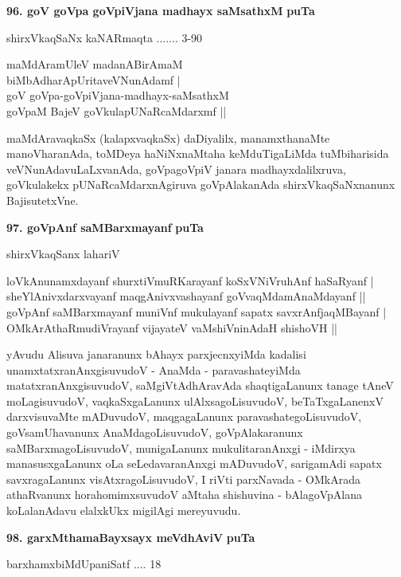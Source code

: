 \medskip
\noindent
\textbf{96. goV goVpa goVpiVjana madhayx saMsathxM} \hfill{\bf puTa \pageref{229}}

\hfill{shirxVkaqSaNx kaNARmaqta ....... 3-90}

\begin{shloka}
maMdAramUleV madanABirAmaM\\
biMbAdharApUritaveVNunAdamf |\\
goV goVpa-goVpiVjana-madhayx-saMsathxM \\
goVpaM BajeV goVkulapUNaRcaMdarxmf ||
\end{shloka}

maMdAravaqkaSx (kalapxvaqkaSx) daDiyalilx, manamxthanaMte manoVharanAda, toMDeya haNiNxnaMtaha keMduTi\-gaLiMda tuMbiharisida veVNunAdavuLaLxvanAda, goVpa\break goVpiV janara madhayxdalilxruva, goVkulakekx pUNaR\-caMdarxnAgiruva goVpAlakanAda shirxVkaqSaNxnanunx BajisutetxVne.


\smallskip
\noindent
\textbf{97. goVpAnf saMBarxmayanf} \hfill{\bf puTa \pageref{229}}

\hfill{shirxVkaqSanx lahariV}

\begin{shloka}
loVkAnunamxdayanf shurxtiVmuRKarayanf koSxVNiVruhAnf haSaRyanf |\\
sheYlAnivxdarxvayanf maqgAnivxvashayanf goVvaqMdamAnaMdayanf ||\\
goVpAnf saMBarxmayanf muniVnf mukulayanf sapatx savxrAnfjaqMBayanf |\\
OMkArAthaRmudiVrayanf vijayateV vaMshiVninAdaH shishoVH ||
\end{shloka}

\smallskip
yAvudu Alisuva janaranunx bAhayx parxjecnxyiMda kadalisi unamxtatxranAnxgi\break\-su\-vudoV  - AnaMda - para\-vashateyiMda matatxranAnxgisuvudoV, saMgiVtAdhAra\-vAda shaqtigaLanunx tanage tAneV moLagisuvudoV, vaqkaSx\-gaLanunx ulAlxsagoLisu\break\-vudoV, beTaTxgaLanenxV darxvisuvaMte mADuvudoV, maqgagaLanunx paravashate\-goLisu\-vudoV, goVsamUhavanunx AnaMdagoLisuvudoV, goVpAlakaranunx saMBarxma\-goLisuvudoV, muni\-gaLanunx mukulitaranAnxgi - iMdirxya manasusxgaLanunx oLa seLedavaranAnxgi mADuvudoV, sarigamAdi sapatx savxragaLanunx visAtxragoLisuvudoV, I riVti parxNavada - OMkArada athaRvanunx horahomimxsu\-vudoV aMtaha shishuvina - bAlagoVpAlana koLalanAdavu elalxkUkx migilAgi mereyuvudu.

\medskip
\noindent
\textbf{98. garxMthamaBayxsayx meVdhAviV} \hfill{\bf puTa \pageref{42}}

\hfill{barxhamxbiMdUpaniSatf .... 18}

